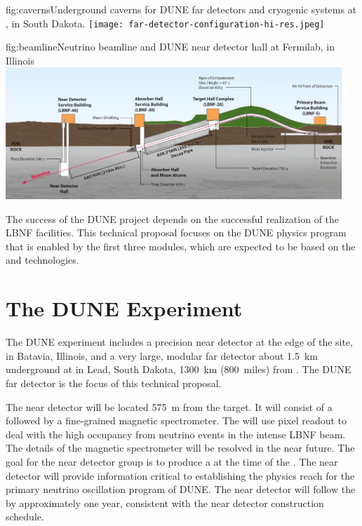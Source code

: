 \begin{dunefigure}{fig:caverns}{Underground caverns for DUNE far detectors and cryogenic systems at \surf{}, in South Dakota.}
\texttt{[image: far-detector-configuration-hi-res.jpeg]}
\end{dunefigure}

\begin{dunefigure}{fig:beamline}{Neutrino beamline and DUNE near detector hall at Fermilab, in Illinois}
\includegraphics[width=0.95\textwidth]{figures/beamline-sideview.jpg}
\end{dunefigure}


The success of the DUNE project depends on the successful realization of the LBNF facilities.
This technical proposal focuses on the DUNE physics program that is enabled by
the first three  modules, which are expected to be based on the  and  \lar technologies. 

\section{The DUNE Experiment} %


The DUNE experiment includes a precision near detector at the edge of the \fnal site, in Batavia, Illinois, and a very large, modular far detector about \SI{1.5}{km} underground at \surf in Lead, South Dakota, \SI{1300}{km} (\SI{800}{miles}) from \fnal. The DUNE far detector is the focus of this technical proposal. 

The near detector will be located \SI{575}{m} from the target. It will consist of a \lartpc followed by a fine-grained magnetic spectrometer. The \lartpc will use pixel readout to deal with the high occupancy from neutrino events in the intense LBNF beam. The details of the magnetic spectrometer will be resolved in the near future. The goal for the near detector group is to produce a  at the time of the  . The near detector  will provide information critical to establishing the physics reach for the primary neutrino oscillation program of DUNE. The near detector  will follow the   by approximately one year, consistent with the near detector construction schedule.

